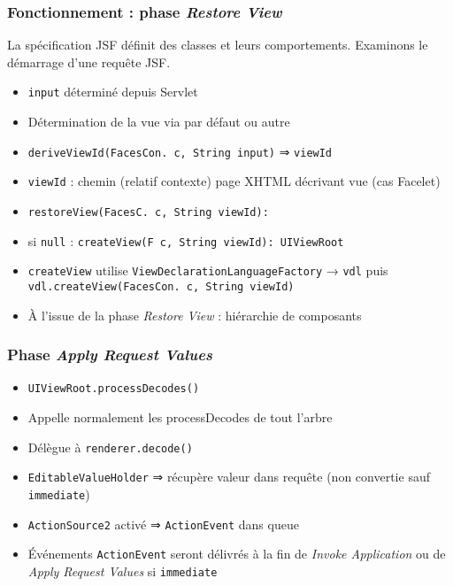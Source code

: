 \documentclass[english, french]{beamer}
\begin{document}
\begin{frame}[label=ph-rv]
	\frametitle{Fonctionnement : phase \emph{Restore View}}
	La spécification JSF définit des classes et leurs comportements. Examinons le démarrage d’une requête JSF.
	\begin{itemize}
		\item \texttt{input} déterminé depuis Servlet %
		\item Détermination de la vue via  par défaut {\tiny ou autre}
		\item \texttt{deriveViewId(FacesCon. c, String input)} ⇒ \texttt{viewId}
		\item \texttt{viewId} : chemin {\tiny (relatif contexte)} page XHTML décrivant vue {\tiny (cas Facelet)}
		\item \texttt{restoreView(FacesC. c, String viewId): }
		\item si \texttt{null} : \texttt{createView(F c, String viewId): UIViewRoot}
		\item \texttt{createView} utilise \texttt{ViewDeclarationLanguageFactory} → \texttt{vdl} puis \texttt{vdl.createView(FacesCon. c, String viewId)}
		\item À l’issue de la phase \emph{Restore View} : hiérarchie de composants
	\end{itemize}
\end{frame}

\begin{frame}[label=ph-arv]
	\frametitle{Phase \emph{Apply Request Values}}
	\begin{itemize}
		\item \texttt{UIViewRoot.processDecodes()}
		\item Appelle {\tiny normalement} les processDecodes de tout l’arbre
		\item Délègue à \texttt{renderer.decode()}%
		\item \texttt{EditableValueHolder} ⇒ récupère valeur dans requête (non convertie {\tiny sauf \texttt{immediate}})
		\item \texttt{ActionSource2} activé ⇒ \texttt{ActionEvent} dans queue
		\item Événements \texttt{ActionEvent} seront délivrés à la fin de \emph{Invoke Application} {\tiny ou de \emph{Apply Request Values} si \texttt{immediate}}
	\end{itemize}
\end{frame}
\end{document}
